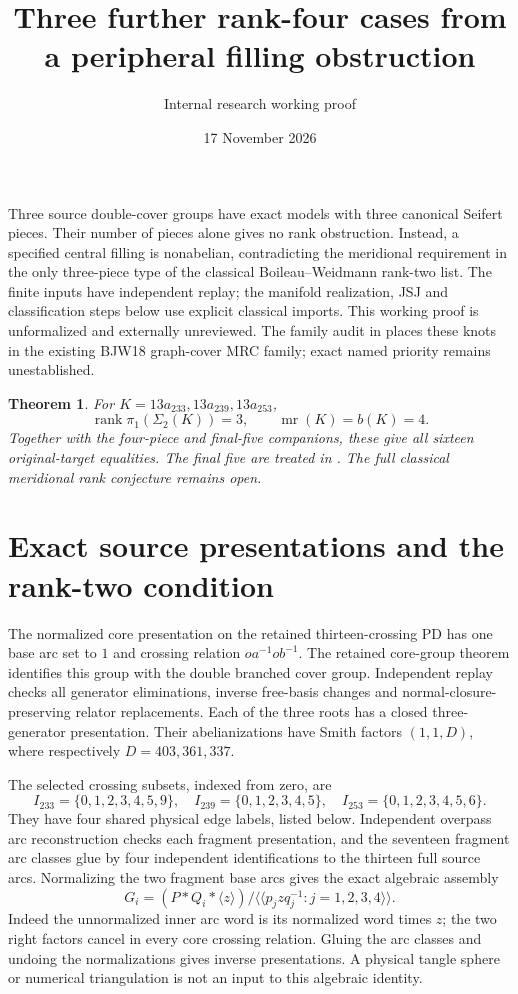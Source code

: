 \documentclass[11pt]{article}
\title{Three further rank-four cases from a peripheral filling obstruction}
\author{Internal research working proof}
\date{17 November 2026}
\newtheorem{theorem}{Theorem}
\newcommand{\rank}{\operatorname{rank}}
\newcommand{\mr}{\operatorname{mr}}
\begin{document}
\maketitle

Three source double-cover groups have exact models with three canonical
Seifert pieces. Their number of pieces alone gives no rank obstruction.
Instead, a specified central filling is nonabelian, contradicting the
meridional requirement in the only three-piece type of the classical
Boileau--Weidmann rank-two list. The finite inputs have independent replay;
the manifold realization, JSJ and classification steps below use explicit
classical imports. This working proof is unformalized and externally
unreviewed. The family audit in
 places these knots
in the existing BJW18 graph-cover MRC family; exact named priority remains
unestablished.

\begin{theorem}
For $K=13a_{233},13a_{239},13a_{253}$,
\[
 \rank\pi_1(\Sigma_2(K))=3,\qquad \mr(K)=b(K)=4.
\]
Together with the four-piece and final-five companions, these give all
sixteen original-target equalities. The final five are treated in
. The full classical
meridional rank conjecture remains open.
\end{theorem}

\section{Exact source presentations and the rank-two condition}

The normalized core presentation on the retained thirteen-crossing PD has
one base arc set to $1$ and crossing relation $o a^{-1}o b^{-1}$.
The retained core-group theorem identifies this group with the double
branched cover group. Independent replay checks all generator eliminations,
inverse free-basis changes and normal-closure-preserving relator replacements.
Each of the three roots has a closed three-generator presentation.
Their abelianizations have Smith factors $(1,1,D)$, where respectively
$D=403,361,337$.

The selected crossing subsets, indexed from zero, are
\[
 I_{233}=\{0,1,2,3,4,5,9\},\quad
 I_{239}=\{0,1,2,3,4,5\},\quad
 I_{253}=\{0,1,2,3,4,5,6\}.
\]
They have four shared physical edge labels, listed below. Independent
overpass arc reconstruction checks each fragment presentation, and the
seventeen fragment arc classes glue by four independent identifications to
the thirteen full source arcs. Normalizing the two fragment base arcs gives
the exact algebraic assembly
\begin{equation}\label{eq:assembly}
 G_i=(P*Q_i*\langle z\rangle)/
 \langle\!\langle p_jzq_j^{-1}:j=1,2,3,4\rangle\!\rangle.
\end{equation}
Indeed the unnormalized inner arc word is its normalized word times $z$;
the two right factors cancel in every core crossing relation. Gluing the
arc classes and undoing the normalizations gives inverse presentations.
A physical tangle sphere or numerical triangulation is not an input to
this algebraic identity.
\end{document}
